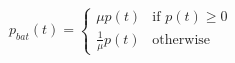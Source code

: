 \begin{equation}
	p_{bat}(t) =
	\begin{cases}
		\mu p(t) &\text{if } p(t) \geq 0\\
		\frac{1}{\mu}p(t) &\text{otherwise}
	\end{cases}
	\label{ch2:equ:battery-power}
\end{equation}